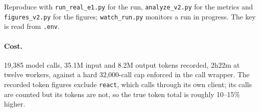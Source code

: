 \documentclass[10pt]{article}
\newcommand{\hr}[1]{\texttt{#1}}
\begin{document}
\noindent Reproduce with \texttt{run\_real\_e1.py} for the run, \texttt{analyze\_v2.py} for
the metrics and \texttt{figures\_v2.py} for the figures; \texttt{watch\_run.py} monitors a run
in progress. The key is read from \texttt{.env}.

\paragraph{Cost.} 19{,}385 model calls, 35.1M input and 8.2M output tokens recorded, 2h22m at
twelve workers, against a hard 32{,}000-call cap enforced in the call wrapper. The recorded token
figures exclude \hr{react}, which calls through its own client; its calls are counted but its
tokens are not, so the true token total is roughly 10--15\% higher.

\end{document}

